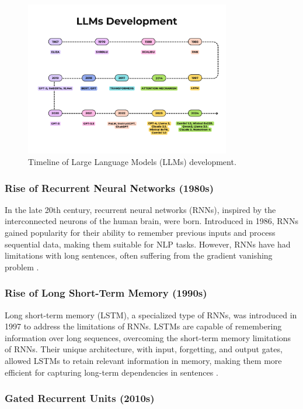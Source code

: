 \begin{figure}[h!]
    \centering
    \includegraphics[width=0.8\textwidth]{images/llms/llms-timeline.png}
    \caption{Timeline of Large Language Models (LLMs) development.}
    \label{fig:llms-history}
\end{figure}

\subsubsection{Rise of Recurrent Neural Networks (1980s)}

In the late 20th century, recurrent neural networks (RNNs), inspired by the interconnected neurons of the human brain, were born. Introduced in 1986, RNNs gained popularity for their ability to remember previous inputs and process sequential data, making them suitable for NLP tasks. However, RNNs have had limitations with long sentences, often suffering from the gradient vanishing problem \cite{elman1990finding}.

\subsubsection{Rise of Long Short-Term Memory (1990s)}

Long short-term memory (LSTM), a specialized type of RNNs, was introduced in 1997 to address the limitations of RNNs. LSTMs are capable of remembering information over long sequences, overcoming the short-term memory limitations of RNNs. Their unique architecture, with input, forgetting, and output gates, allowed LSTMs to retain relevant information in memory, making them more efficient for capturing long-term dependencies in sentences \cite{hochreiter1997long}.

\subsubsection{Gated Recurrent Units (2010s)}

